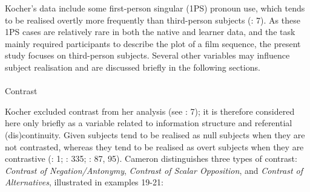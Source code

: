 \documentclass[
  letterpaper,
  DIV=11,
  numbers=noendperiod]{scrartcl}
\makeatletter
\let\oldparagraph\paragraph
\renewcommand{\paragraph}{
    \@ifstar
      \xxxParagraphStar
      \xxxParagraphNoStar
  }
\newcommand{\xxxParagraphStar}[1]{\oldparagraph*{#1}\mbox{}}
\newcommand{\xxxParagraphNoStar}[1]{\oldparagraph{#1}\mbox{}}
\makeatother
\begin{document}
Kocher's data include some first-person singular (1PS) pronoun use,
which tends to be realised overtly more frequently than third-person
subjects (: 7). As these
1PS cases are relatively rare in both the native and learner data, and
the task mainly required participants to describe the plot of a film
sequence, the present study focuses on third-person subjects. Several
other variables may influence subject realisation and are discussed
briefly in the following sections.

\paragraph{Contrast}\label{contrast}

Kocher excluded contrast from her analysis (see
: 7); it is therefore considered
here only briefly as a variable related to information structure and
referential (dis)continuity. Given subjects tend to be realised as null
subjects when they are not contrasted, whereas they tend to be realised
as overt subjects when they are contrastive
(: 1;
: 335;
: 87, 95). Cameron
distinguishes three types of contrast: \emph{Contrast of
Negation/Antonymy}, \emph{Contrast of Scalar Opposition}, and
\emph{Contrast of Alternatives}, illustrated in examples 19-21:
\end{document}
